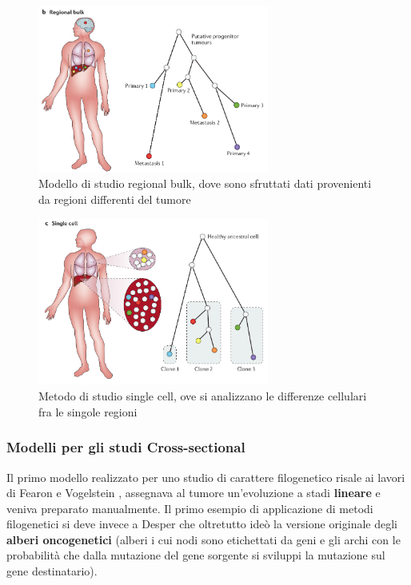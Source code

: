 \documentclass[a4paper]{article}
\begin{document}
	\begin{figure}[H]
	  \centering
	  \includegraphics[height=5.5cm, keepaspectratio]{RegionalBulk.png}%
	  \captionsetup{justification=centering,margin=0.5cm}
	  \caption{Modello di studio regional bulk, dove sono sfruttati dati provenienti da regioni differenti del tumore} \label{fig:RegionalBulk}
	\end{figure}

	\begin{figure}[H]
	  \centering
	  \includegraphics[height=5.5cm, keepaspectratio]{SingleCell.png}%
	  \captionsetup{justification=centering,margin=0.5cm}
	  \caption{Metodo di studio single cell, ove si analizzano le differenze cellulari fra le singole regioni} \label{fig:SingleCell}
	\end{figure}

	\subsubsection{Modelli per gli studi Cross-sectional}
	
	Il primo modello realizzato per uno studio di carattere filogenetico risale ai lavori di Fearon e Vogelstein \cite{FerVog}, assegnava al tumore un'evoluzione a stadi \textbf{lineare} e veniva preparato 
	manualmente. Il primo esempio di applicazione di metodi filogenetici si deve invece a Desper \cite{Desper} che oltretutto ideò la versione originale degli \textbf{alberi oncogenetici} (alberi i cui nodi sono etichettati da
	geni e gli archi con le probabilità che dalla mutazione del gene sorgente si sviluppi la mutazione sul gene destinatario).
\end{document}

